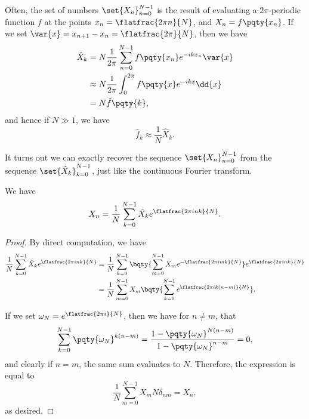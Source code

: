 Often, the set of numbers \(\set{X_n}_{n = 0}^{N - 1}\) is the result of evaluating a \(2\pi\)-periodic function \(f\) at the points \(x_n = \flatfrac{2 \pi n}{N}\), and \(X_n = f\pqty{x_n}\). If we set \(\var{x} = x_{n + 1} - x_n = \flatfrac{2 \pi}{N}\), then we have
\begin{subequations}
    \begin{align}
        \hat{X}_k &= N \frac{1}{2\pi} \sum_{n = 0}^{N - 1} f\pqty{x_n} e^{- i k x_n} \var{x} \\
        &\approx N \frac{1}{2\pi} \int_{0}^{2 \pi} f\pqty{x} e^{- i k x} \dd{x} \\
        &= N \hat{f}\pqty{k},
    \end{align}
\end{subequations}
and hence if \(N \gg 1\), we have
\begin{equation}
    \hat{f}_k \approx \frac{1}{N} \hat{X}_k.
\end{equation}

It turns out we can exactly recover the sequence \(\set{X_n}_{n = 0}^{N - 1}\) from the sequence \(\set{\hat{X}_k}_{k = 0}^{N - 1}\), just like the continuous Fourier transform.

\begin{proposition}
    We have
    \begin{equation}
        X_n = \frac{1}{N} \sum_{k = 0}^{N - 1} \hat{X}_k e^{\flatfrac{2 \pi i n k}{N}}.
    \end{equation}
\end{proposition}

\begin{proof}
    By direct computation, we have
    \begin{subequations}
        \begin{align}
            \frac{1}{N} \sum_{k = 0}^{N - 1} \hat{X}_k e^{\flatfrac{2 \pi i n k}{N}} &= \frac{1}{N} \sum_{k = 0}^{N - 1} \bqty{\sum_{m = 0}^{N - 1} X_m e^{- \flatfrac{2 \pi i m k}{N}}} e^{\flatfrac{2 \pi i n k}{N}} \\
            &= \frac{1}{N} \sum_{m = 0}^{N - 1} X_m \bqty{\sum_{k = 0}^{N - 1} e^{\flatfrac{2 \pi i k (n - m)}{N}}}.
        \end{align}
    \end{subequations}
    
    If we set \(\omega_N = e^{\flatfrac{2 \pi i}{N}}\), then we have for \(n \neq m\), that
    \begin{equation}
        \sum_{k = 0}^{N - 1} \pqty{\omega_N}^{k (n - m)} = \frac{1 - \pqty{\omega_N}^{N (n - m)}}{1 - \pqty{\omega_N}^{n - m}} = 0,
    \end{equation}
    and clearly if \(n = m\), the same sum evaluates to \(N\). Therefore, the expression is equal to
    \begin{equation}
        \frac{1}{N} \sum_{m = 0}^{N - 1} X_m N \delta_{nm} = X_n,
    \end{equation}
    as desired.
\end{proof}

